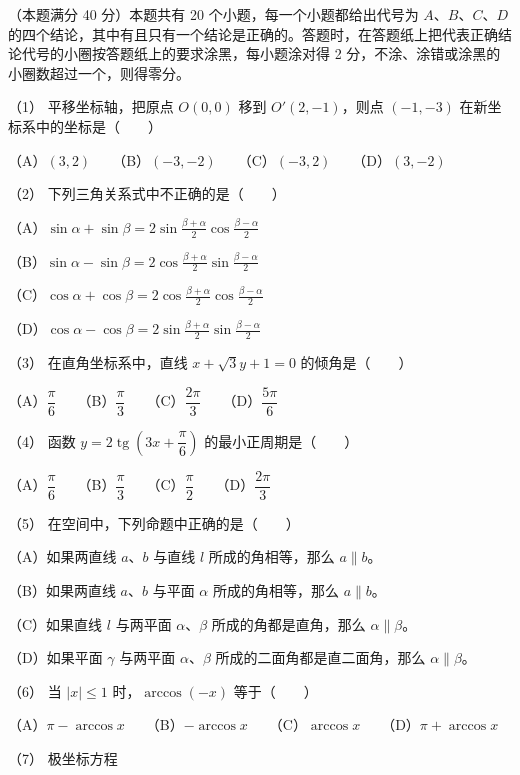 \begin{question}
（本题满分 40 分）本题共有 20 个小题，每一个小题都给出代号为 $A\text{、}B\text{、}C\text{、}D$ 的四个结论，其中有且只有一个结论是正确的。答题时，在答题纸上把代表正确结论代号的小圈按答题纸上的要求涂黑，每小题涂对得 2 分，不涂、涂错或涂黑的小圈数超过一个，则得零分。

（1） 平移坐标轴，把原点 $O(0,0)$ 移到 $O'(2,-1)$，则点 $(-1,-3)$ 在新坐标系中的坐标是\mbox{（　　）}

（A）$(3,2)$　　（B）$(-3,-2)$　　（C）$(-3,2)$　　（D）$(3,-2)$

（2） 下列三角关系式中不正确的是\mbox{（　　）}

（A）$\sin\alpha+\sin\beta=2\sin\frac{\beta+\alpha}{2}\cos\frac{\beta-\alpha}{2}$

（B）$\sin\alpha-\sin\beta=2\cos\frac{\beta+\alpha}{2}\sin\frac{\beta-\alpha}{2}$

（C）$\cos\alpha+\cos\beta=2\cos\frac{\beta+\alpha}{2}\cos\frac{\beta-\alpha}{2}$

（D）$\cos\alpha-\cos\beta=2\sin\frac{\beta+\alpha}{2}\sin\frac{\beta-\alpha}{2}$

（3） 在直角坐标系中，直线 $x+\sqrt3y+1=0$ 的倾角是\mbox{（　　）}

（A）$\dfrac\pi6$　　（B）$\dfrac\pi3$　　（C）$\dfrac{2\pi}3$　　（D）$\dfrac{5\pi}6$

（4） 函数 $y=2\operatorname{tg}\left(3x+\dfrac\pi6\right)$ 的最小正周期是\mbox{（　　）}

（A）$\dfrac\pi6$　　（B）$\dfrac\pi3$　　（C）$\dfrac\pi2$　　（D）$\dfrac{2\pi}3$

（5） 在空间中，下列命题中正确的是\mbox{（　　）}

（A）如果两直线 $a\text{、}b$ 与直线 $l$ 所成的角相等，那么 $a\parallel b$。

（B）如果两直线 $a\text{、}b$ 与平面 $\alpha$ 所成的角相等，那么 $a\parallel b$。

（C）如果直线 $l$ 与两平面 $\alpha\text{、}\beta$ 所成的角都是直角，那么 $\alpha\parallel\beta$。

（D）如果平面 $\gamma$ 与两平面 $\alpha\text{、}\beta$ 所成的二面角都是直二面角，那么 $\alpha\parallel\beta$。

（6） 当 $|x|\le1$ 时，$\arccos(-x)$ 等于\mbox{（　　）}

（A）$\pi-\arccos x$　　（B）$-\arccos x$　　（C）$\arccos x$　　（D）$\pi+\arccos x$

（7） 极坐标方程


\end{question}
